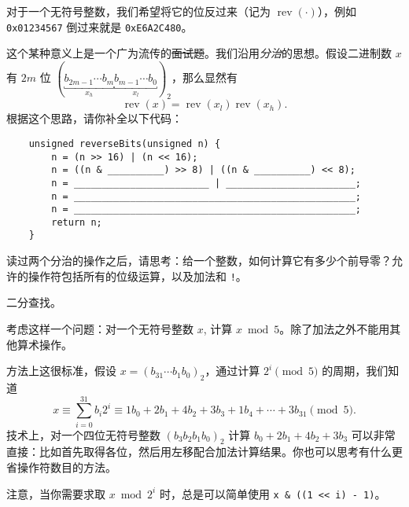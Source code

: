     \begin{example}[模拟操作 2]
        对于一个无符号整数，我们希望将它的位反过来（记为 $\operatorname{rev}(\cdot)$），例如 \texttt{0x01234567} 倒过来就是 \texttt{0xE6A2C480}。

        这个某种意义上是一个广为流传的\sout{面试题}。我们沿用\emph{分治}的思想。假设二进制数 $x$ 有 $2m$ 位 $(\underbracket{b_{2m-1} \dotsm b_m}_{x_h} \underbracket{b_{m-1} \dotsm b_0}_{x_l})_2$，那么显然有
        \[ \operatorname{rev}(x) = \operatorname{rev}(x_l) \operatorname{rev}(x_h). \]
        根据这个思路，请你补全以下代码：
        \begin{verbatim}
    unsigned reverseBits(unsigned n) {
        n = (n >> 16) | (n << 16);
        n = ((n & __________) >> 8) | ((n & __________) << 8);
        n = ________________________ | _______________________;
        n = __________________________________________________;
        n = __________________________________________________;
        return n;
    }
        \end{verbatim}

        读过两个分治的操作之后，请思考：给一个整数，如何计算它有多少个前导零？允许的操作符包括所有的位级运算，以及加法和 \texttt{!}。\begin{hint} 二分查找。 \end{hint}
    \end{example}

    \begin{example}[算术运算]
        考虑这样一个问题：对一个无符号整数 $x$, 计算 $x \bmod 5$。除了加法之外不能用其他算术操作。

        方法上这很标准，假设 $x=(b_{31} \dotsm b_1b_0)_2$，通过计算 $2^i \pmod 5$ 的周期，我们知道
        \[ x \equiv \sum_{i=0}^{31} b_i2^i \equiv 1b_0+2b_1+4b_2+3b_3+1b_4 + \dotsb + 3b_{31} \pmod 5. \]
        技术上，对一个四位无符号整数 $(b_3b_2b_1b_0)_2$ 计算 $b_0+2b_1+4b_2+3b_3$ 可以非常直接：比如首先取得各位，然后用左移配合加法计算结果。你也可以思考有什么更省操作符数目的方法。

        注意，当你需要求取 $x \bmod 2^i$ 时，总是可以简单使用 \verb|x & ((1 << i) - 1)|。
    \end{example}